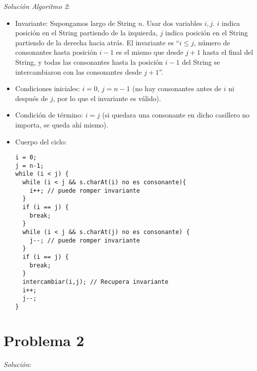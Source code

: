 \documentclass[11pt,spanish]{article}
\begin{document}
\emph{Solución Algoritmo 2}:

\begin{itemize}

\item Invariante: Supongamos largo de String $n$. Usar dos variables $i,j$. $i$ indica posición en el String partiendo de la izquierda, $j$ indica posición en el String partiendo de la derecha hacia atrás. El invariante es ``$i \leq j$, número de consonantes hasta posición $i-1$ es el mismo que desde $j+1$ hasta el final del String, y todas las consonantes hasta la posición $i-1$ del String se intercambiaron con las consonantes desde $j+1$''.

\item Condiciones iniciales: $i=0$, $j=n-1$ (no hay consonantes antes de $i$ ni después de $j$, por lo que el invariante es válido).

\item Condición de término: $i=j$ (si quedara una consonante en dicho casillero no importa, se queda ahí mismo).
\newpage
\item Cuerpo del ciclo:

\begin{verbatim}
i = 0;
j = n-1;
while (i < j) {
  while (i < j && s.charAt(i) no es consonante){
    i++; // puede romper invariante
  }
  if (i == j) {
    break;
  }
  while (i < j && s.charAt(j) no es consonante) {
    j--; // puede romper invariante
  }
  if (i == j) {
    break;
  }
  intercambiar(i,j); // Recupera invariante
  i++;
  j--;
}
\end{verbatim}

\end{itemize}
\newpage
\section*{Problema 2}

\emph{Solución}:
\end{document}
